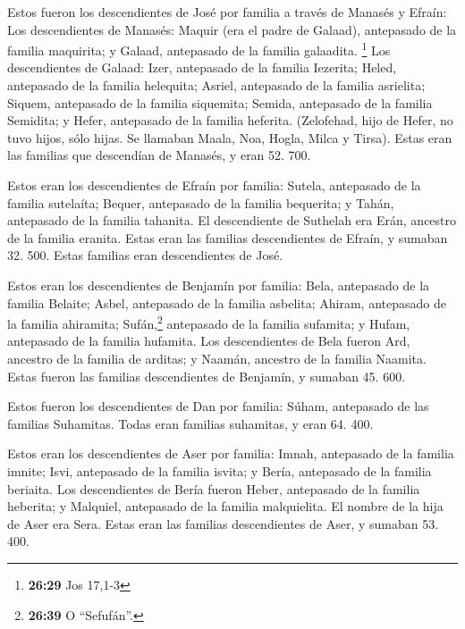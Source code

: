  Estos fueron los descendientes de José por familia a
través de Manasés y Efraín:  Los descendientes de
Manasés: Maquir (era el padre de Galaad), antepasado de la familia
maquirita; y Galaad, antepasado de la familia galaadita. \footnote{\textbf{26:29}
  Jos 17,1-3}  Los descendientes de Galaad: Izer,
antepasado de la familia Iezerita; Heled, antepasado de la familia
helequita;  Asriel, antepasado de la familia asrielita;
Siquem, antepasado de la familia siquemita;  Semida,
antepasado de la familia Semidita; y Hefer, antepasado de la familia
heferita.  (Zelofehad, hijo de Hefer, no tuvo hijos, sólo
hijas. Se llamaban Maala, Noa, Hogla, Milca y Tirsa). 
Estas eran las familias que descendían de Manasés, y eran 52. 700.

 Estos eran los descendientes de Efraín por familia:
Sutela, antepasado de la familia sutelaíta; Bequer, antepasado de la
familia bequerita; y Tahán, antepasado de la familia tahanita.
 El descendiente de Suthelah era Erán, ancestro de la
familia eranita.  Estas eran las familias descendientes
de Efraín, y sumaban 32. 500. Estas familias eran descendientes de José.

 Estos eran los descendientes de Benjamín por familia:
Bela, antepasado de la familia Belaite; Asbel, antepasado de la familia
asbelita; Ahiram, antepasado de la familia ahiramita; 
Sufán,\footnote{\textbf{26:39} O ``Sefufán''.} antepasado de la familia
sufamita; y Hufam, antepasado de la familia hufamita. 
Los descendientes de Bela fueron Ard, ancestro de la familia de arditas;
y Naamán, ancestro de la familia Naamita.  Estas fueron
las familias descendientes de Benjamín, y sumaban 45. 600.

 Estos fueron los descendientes de Dan por familia:
Súham, antepasado de las familias Suhamitas.  Todas eran
familias suhamitas, y eran 64. 400.

 Estos eran los descendientes de Aser por familia: Imnah,
antepasado de la familia imnite; Isvi, antepasado de la familia isvita;
y Bería, antepasado de la familia beriaita.  Los
descendientes de Bería fueron Heber, antepasado de la familia heberita;
y Malquiel, antepasado de la familia malquielita.  El
nombre de la hija de Aser era Sera.  Estas eran las
familias descendientes de Aser, y sumaban 53. 400.

